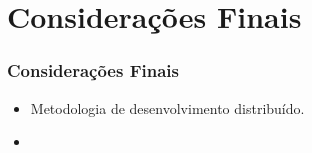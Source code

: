 \section{Considerações Finais}

\frame
{
\frametitle{Considerações Finais}
\begin{itemize}
	\item Metodologia de desenvolvimento distribuído.
	\item 
\end{itemize}
}

\frame
{
\frametitle{}
}

